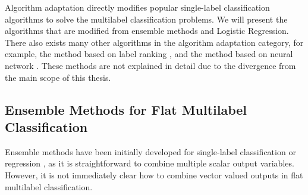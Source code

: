 {Algorithm adaptation directly modifies popular single-label classification algorithms to solve the multilabel classification problems.
We will present the algorithms that are modified from ensemble methods and Logistic Regression.
There also exists many other algorithms in the algorithm adaptation category, for example, the method based on label ranking \citep{Crammer03afamily}, and the method based on neural network \citep{Zhang06multilabel}.
These methods are not explained in detail due to the divergence from the main scope of this thesis.



%
%
\subsection{Ensemble Methods for Flat Multilabel Classification} \label{sc_emfmlc}

Ensemble methods have been initially developed for single-label classification \citep{Breiman96bagging,Freund97a} or regression \citep{Breiman96bagging}, as it is straightforward to combine multiple scalar output variables.
However, it is not immediately clear how to combine vector valued outputs in flat multilabel classification.

}
